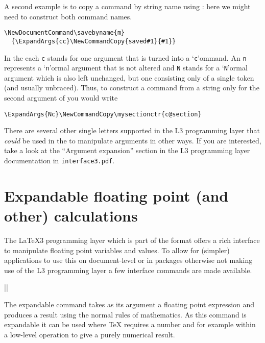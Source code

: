\documentclass{ltxguide}
\begin{document}
A second example is to copy a command by string name using
: here we might need to construct both command
names.
\begin{verbatim}
\NewDocumentCommand\savebyname{m}
  {\ExpandArgs{cc}\NewCommandCopy{saved#1}{#1}}
\end{verbatim}

In the  each \texttt{c} stands for one argument that is
turned into a `\texttt{c}'ommand. An \texttt{n} represents a
`\texttt{n}'ormal argument that is not altered and \texttt{N} stands for
a `\texttt{N}'ormal argument which is also left unchanged, but one
consisting only of a single token (and usually unbraced). Thus, to
construct a command from a string only for the second argument of
 you would write
\begin{verbatim}
\ExpandArgs{Nc}\NewCommandCopy\mysectionctr{c@section}
\end{verbatim}
There are several other single letters supported in the L3 programming
layer that \emph{could} be used in the  to manipulate
arguments in other ways.  If you are interested, take a look at the
\enquote{Argument expansion} section in the L3 programming layer
documentation in \texttt{interface3.pdf}.



\section{Expandable floating point (and other) calculations}

The \LaTeX3 programming layer which is part of the format offers a
rich interface to manipulate floating point variables and values. To
allow for (simpler) applications to use this on document-level or in
packages otherwise not making use of the L3 programming layer a few
interface commands are made available.


\begin{decl}
  |\fpeval| 
\end{decl}

The expandable command  takes as its argument a floating
point expression and produces a result using the normal rules of
mathematics. As this command is expandable it can be used where \TeX{}
requires a number and for example within a low-level  operation
to give a purely numerical result.
\end{document}

